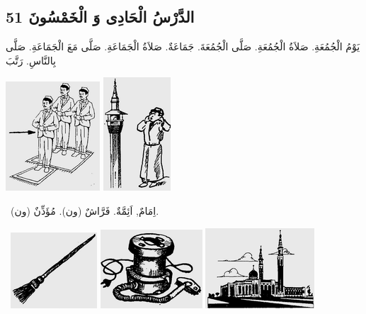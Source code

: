 \documentclass[a5paper]{article}
\begin{document}
\subsection{الدَّرْسُ الْحَادِى وَ الْخَمْسُونَ 51}
يَوْمُ الْجُمُعَةِ. صَلاَةُ الْجُمُعَةِ. صَلَّى الْجُمُعَةَ. جَمَاعَةٌ. صَلاَةُ الْجَمَاعَةِ. صَلَّى مَعَ الْجَمَاعَةِ. صَلَّى بِالنَّاسِ. رَتَّبَ 

 \includegraphics[width=1.3854in,height=1.6043in]{images/MuhammadBagauddinprettified-img166.png}   \includegraphics[width=0.9898in,height=1.6665in]{images/MuhammadBagauddinprettified-img167.png} 

\ اِمَامٌ, اَئِمَّةٌ. فَرَّاشٌ (ون). مُؤَذِّنٌ (ون). 

\  \includegraphics[width=1.2709in,height=1.1146in]{images/MuhammadBagauddinprettified-img168.png}   \includegraphics[width=1.5in,height=1.1563in]{images/MuhammadBagauddinprettified-img169.png}   \includegraphics[width=1.6043in,height=1.1772in]{images/MuhammadBagauddinprettified-img170.png} 
\end{document}
